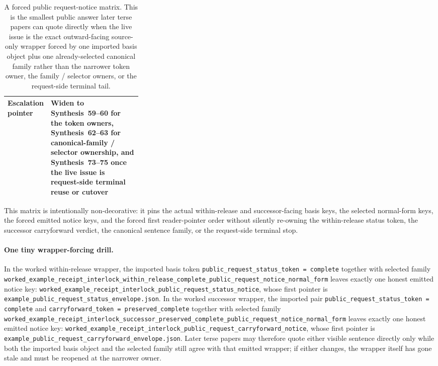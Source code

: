 \documentclass[11pt]{article}
\begin{document}
\begin{table}[t]
\begin{tabularx}{0.97\linewidth}{@{}p{0.31\linewidth}X@{}}
Escalation pointer & Widen to Synthesis~59--60 for the token owners, Synthesis~62--63 for canonical-family / selector ownership, and Synthesis~73--75 once the live issue is request-side terminal reuse or cutover \\
\bottomrule
\end{tabularx}
\caption{A forced public request-notice matrix. This is the smallest public answer later terse papers can quote directly when the live issue is the exact outward-facing source-only wrapper forced by one imported basis object plus one already-selected canonical family rather than the narrower token owner, the family / selector owners, or the request-side terminal tail.}
\label{tab:forced-public-request-notice-matrix}
\end{table}

This matrix is intentionally non-decorative: it pins the actual within-release and successor-facing basis keys, the selected normal-form keys, the forced emitted notice keys, and the forced first reader-pointer order without silently re-owning the within-release status token, the successor carryforward verdict, the canonical sentence family, or the request-side terminal stop.\cite{series:workedexample}

\paragraph{One tiny wrapper-forcing drill.}
In the worked within-release wrapper, the imported basis token \texttt{public\_request\_status\_token = complete} together with selected family \nolinkurl{worked_example_receipt_interlock_within_release_complete_public_request_notice_normal_form} leaves exactly one honest emitted notice key: \nolinkurl{worked_example_receipt_interlock_public_request_status_notice}, whose first pointer is \nolinkurl{example_public_request_status_envelope.json}. In the worked successor wrapper, the imported pair \texttt{public\_request\_status\_token = complete} and \texttt{carryforward\_token = preserved\_complete} together with selected family \nolinkurl{worked_example_receipt_interlock_successor_preserved_complete_public_request_notice_normal_form} leaves exactly one honest emitted notice key: \nolinkurl{worked_example_receipt_interlock_public_request_carryforward_notice}, whose first pointer is \nolinkurl{example_public_request_carryforward_envelope.json}. Later terse papers may therefore quote either visible sentence directly only while both the imported basis object and the selected family still agree with that emitted wrapper; if either changes, the wrapper itself has gone stale and must be reopened at the narrower owner.\cite{series:workedexample}
\end{document}

